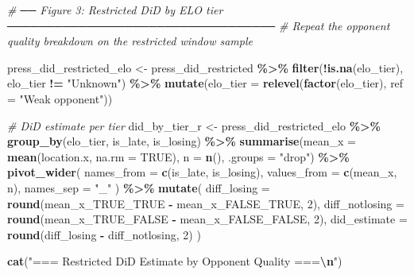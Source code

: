 \documentclass[
]{article}
\newenvironment{Shaded}{\begin{snugshade}}{\end{snugshade}}
\newcommand{\AttributeTok}[1]{\textcolor[rgb]{0.13,0.29,0.53}{#1}}
\newcommand{\CommentTok}[1]{\textcolor[rgb]{0.56,0.35,0.01}{\textit{#1}}}
\newcommand{\ConstantTok}[1]{\textcolor[rgb]{0.56,0.35,0.01}{#1}}
\newcommand{\DecValTok}[1]{\textcolor[rgb]{0.00,0.00,0.81}{#1}}
\newcommand{\FunctionTok}[1]{\textcolor[rgb]{0.13,0.29,0.53}{\textbf{#1}}}
\newcommand{\NormalTok}[1]{#1}
\newcommand{\OtherTok}[1]{\textcolor[rgb]{0.56,0.35,0.01}{#1}}
\newcommand{\SpecialCharTok}[1]{\textcolor[rgb]{0.81,0.36,0.00}{\textbf{#1}}}
\newcommand{\StringTok}[1]{\textcolor[rgb]{0.31,0.60,0.02}{#1}}
\begin{document}
\begin{Shaded}
\begin{Highlighting}[]
\CommentTok{\# ── Figure 3: Restricted DiD by ELO tier ──────────────────────────────────}
\CommentTok{\# Repeat the opponent quality breakdown on the restricted window sample}

\NormalTok{press\_did\_restricted\_elo }\OtherTok{\textless{}{-}}\NormalTok{ press\_did\_restricted }\SpecialCharTok{\%\textgreater{}\%}
  \FunctionTok{filter}\NormalTok{(}\SpecialCharTok{!}\FunctionTok{is.na}\NormalTok{(elo\_tier), elo\_tier }\SpecialCharTok{!=} \StringTok{"Unknown"}\NormalTok{) }\SpecialCharTok{\%\textgreater{}\%}
  \FunctionTok{mutate}\NormalTok{(}\AttributeTok{elo\_tier =} \FunctionTok{relevel}\NormalTok{(}\FunctionTok{factor}\NormalTok{(elo\_tier), }\AttributeTok{ref =} \StringTok{"Weak opponent"}\NormalTok{))}

\CommentTok{\# DiD estimate per tier}
\NormalTok{did\_by\_tier\_r }\OtherTok{\textless{}{-}}\NormalTok{ press\_did\_restricted\_elo }\SpecialCharTok{\%\textgreater{}\%}
  \FunctionTok{group\_by}\NormalTok{(elo\_tier, is\_late, is\_losing) }\SpecialCharTok{\%\textgreater{}\%}
  \FunctionTok{summarise}\NormalTok{(}\AttributeTok{mean\_x =} \FunctionTok{mean}\NormalTok{(location.x, }\AttributeTok{na.rm =} \ConstantTok{TRUE}\NormalTok{),}
            \AttributeTok{n =} \FunctionTok{n}\NormalTok{(), }\AttributeTok{.groups =} \StringTok{"drop"}\NormalTok{) }\SpecialCharTok{\%\textgreater{}\%}
  \FunctionTok{pivot\_wider}\NormalTok{(}
    \AttributeTok{names\_from  =} \FunctionTok{c}\NormalTok{(is\_late, is\_losing),}
    \AttributeTok{values\_from =} \FunctionTok{c}\NormalTok{(mean\_x, n),}
    \AttributeTok{names\_sep   =} \StringTok{"\_"}
\NormalTok{  ) }\SpecialCharTok{\%\textgreater{}\%}
  \FunctionTok{mutate}\NormalTok{(}
    \AttributeTok{diff\_losing    =} \FunctionTok{round}\NormalTok{(mean\_x\_TRUE\_TRUE  }\SpecialCharTok{{-}}\NormalTok{ mean\_x\_FALSE\_TRUE,  }\DecValTok{2}\NormalTok{),}
    \AttributeTok{diff\_notlosing =} \FunctionTok{round}\NormalTok{(mean\_x\_TRUE\_FALSE }\SpecialCharTok{{-}}\NormalTok{ mean\_x\_FALSE\_FALSE, }\DecValTok{2}\NormalTok{),}
    \AttributeTok{did\_estimate   =} \FunctionTok{round}\NormalTok{(diff\_losing }\SpecialCharTok{{-}}\NormalTok{ diff\_notlosing, }\DecValTok{2}\NormalTok{)}
\NormalTok{  )}

\FunctionTok{cat}\NormalTok{(}\StringTok{"=== Restricted DiD Estimate by Opponent Quality ===}\SpecialCharTok{\textbackslash{}n}\StringTok{"}\NormalTok{)}
\end{Highlighting}
\end{Shaded}
\end{document}
